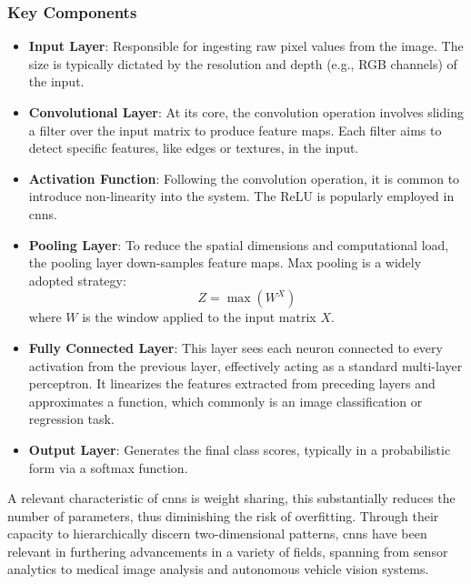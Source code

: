\subsubsection{Key Components}

\begin{itemize}
	\item \textbf{Input Layer}: Responsible for ingesting raw pixel values from the image. The size is typically dictated by the resolution and depth (e.g., RGB channels) of the input.
	
	\item \textbf{Convolutional Layer}: At its core, the convolution operation involves sliding a filter over the input matrix to produce feature maps. Each filter aims to detect specific features, like edges or textures, in the input.
	
	\item \textbf{Activation Function}: Following the convolution operation, it is common to introduce non-linearity into the system. The ReLU is popularly employed in \glspl{cnn}.
	
	\item \textbf{Pooling Layer}: To reduce the spatial dimensions and computational load, the pooling layer down-samples feature maps. Max pooling is a widely adopted strategy:
	\begin{equation}
	Z = \max(W ^ X)
	\end{equation}
	where \(W\) is the window applied to the input matrix \(X\).
	
	\item \textbf{Fully Connected Layer}: This layer sees each neuron connected to every activation from the previous layer, effectively acting as a standard multi-layer perceptron. It linearizes the features extracted from preceding layers and approximates a function, which commonly is an image classification or regression task.
	
	\item \textbf{Output Layer}: Generates the final class scores, typically in a probabilistic form via a softmax function.
\end{itemize}

A relevant characteristic of \glspl{cnn} is weight sharing, this substantially reduces the number of parameters, thus diminishing the risk of overfitting. Through their capacity to hierarchically discern two-dimensional patterns, \glspl{cnn} have been relevant in furthering advancements in a variety of fields, spanning from sensor analytics to medical image analysis and autonomous vehicle vision systems.

